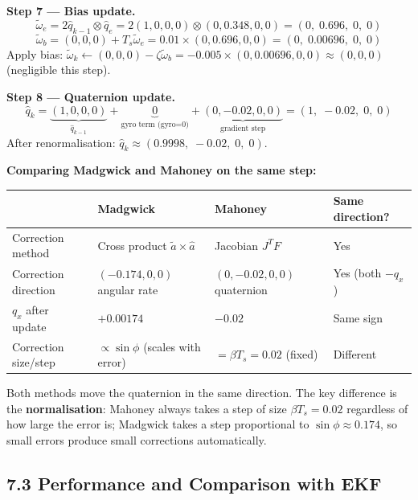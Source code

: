 \documentclass[12pt, a4paper]{article}
\begin{document}
\begin{notebox}
  \textbf{Step 7 --- Bias update.}
  \[
    \tilde{\omega}_{e} = 2\hat{q}_{k-1}\otimes\hat{q}_e
    = 2(1,0,0,0)\otimes(0,0.348,0,0)
    = (0,\;0.696,\;0,\;0)
  \]
  \[
    \tilde{\omega}_{b} = (0,0,0) + T_s\tilde{\omega}_e
    = 0.01\times(0,0.696,0,0)
    = (0,\;0.00696,\;0,\;0)
  \]
  Apply bias: $\tilde{\omega}_k \leftarrow (0,0,0) - \zeta\tilde{\omega}_b
  = -0.005\times(0,0.00696,0,0) \approx (0,0,0)$ (negligible this step).

  \textbf{Step 8 --- Quaternion update.}
  \[
    \hat{q}_k
    = \underbrace{(1,0,0,0)}_{\hat{q}_{k-1}}
    + \underbrace{0}_{\text{gyro term (gyro=0)}}
    + \underbrace{(0,-0.02,0,0)}_{\text{gradient step}}
    = (1,\;-0.02,\;0,\;0)
  \]
  After renormalisation: $\hat{q}_k \approx (0.9998,\;-0.02,\;0,\;0)$.

  \medskip
  \textbf{Comparing Madgwick and Mahoney on the same step:}

  \medskip
  \begin{tabular}{@{} l l l l @{}}
    \toprule
    & \textbf{Madgwick} & \textbf{Mahoney} & \textbf{Same direction?}\\
    \midrule
    Correction method & Cross product $\tilde{a}\times\hat{a}$ &
      Jacobian $J^TF$ & Yes \\
    Correction direction & $(-0.174, 0, 0)$ angular rate &
      $(0, -0.02, 0, 0)$ quaternion & Yes (both $-q_x$)\\
    $q_x$ after update & $+0.00174$ & $-0.02$ & Same sign \\
    Correction size/step & $\propto \sin\phi$ (scales with error) &
      $= \beta T_s = 0.02$ (fixed) & Different \\
    \bottomrule
  \end{tabular}

  \medskip
  Both methods move the quaternion in the same direction.
  The key difference is the \textbf{normalisation}: Mahoney always
  takes a step of size $\beta T_s = 0.02$ regardless of how large the
  error is; Madgwick takes a step proportional to $\sin\phi \approx 0.174$,
  so small errors produce small corrections automatically.
\end{notebox}

\subsection*{7.3 \quad Performance and Comparison with EKF}
\end{document}

